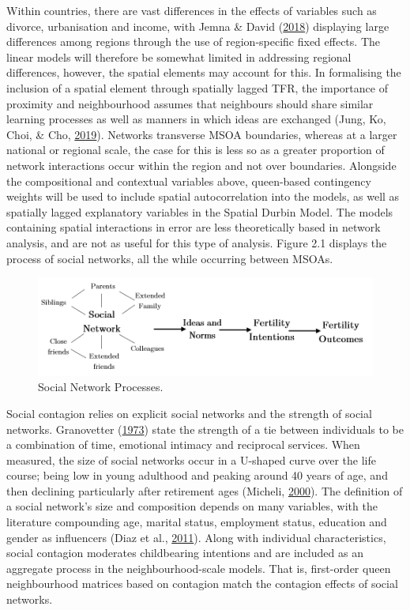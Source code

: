 \documentclass[12pt,twoside]{reedthesis}
\begin{document}
Within countries, there are vast differences in the effects of variables such as divorce, urbanisation and income, with Jemna \& David (\protect\hyperlink{ref-jemna2018}{2018}) displaying large differences among regions through the use of region-specific fixed effects. The linear models will therefore be somewhat limited in addressing regional differences, however, the spatial elements may account for this. In formalising the inclusion of a spatial element through spatially lagged TFR, the importance of proximity and neighbourhood assumes that neighbours should share similar learning processes as well as manners in which ideas are exchanged (Jung, Ko, Choi, \& Cho, \protect\hyperlink{ref-jung2019}{2019}). Networks transverse MSOA boundaries, whereas at a larger national or regional scale, the case for this is less so as a greater proportion of network interactions occur within the region and not over boundaries. Alongside the compositional and contextual variables above, queen-based contingency weights will be used to include spatial autocorrelation into the models, as well as spatially lagged explanatory variables in the Spatial Durbin Model. The models containing spatial interactions in error are less theoretically based in network analysis, and are not as useful for this type of analysis. Figure 2.1 displays the process of social networks, all the while occurring between MSOAs.
\begin{figure}
\includegraphics[width=0.95\linewidth]{figure/Figure_1} \caption{Social Network Processes.}\label{fig:figure1}
\end{figure}
Social contagion relies on explicit social networks and the strength of social networks. Granovetter (\protect\hyperlink{ref-granovetter1973}{1973}) state the strength of a tie between individuals to be a combination of time, emotional intimacy and reciprocal services. When measured, the size of social networks occur in a U-shaped curve over the life course; being low in young adulthood and peaking around 40 years of age, and then declining particularly after retirement ages (Micheli, \protect\hyperlink{ref-micheli2000}{2000}). The definition of a social network's size and composition depends on many variables, with the literature compounding age, marital status, employment status, education and gender as influencers (Diaz et al., \protect\hyperlink{ref-diaz2011}{2011}). Along with individual characteristics, social contagion moderates childbearing intentions and are included as an aggregate process in the neighbourhood-scale models. That is, first-order queen neighbourhood matrices based on contagion match the contagion effects of social networks.
\end{document}
